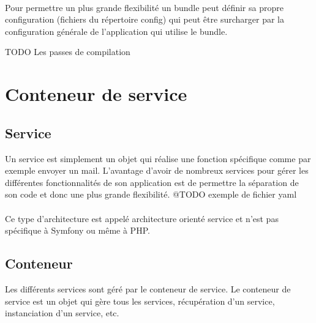 \paragraph{}
Pour permettre un plus grande flexibilité un bundle peut définir sa propre configuration (fichiers du répertoire config) qui peut être surcharger par la configuration générale de l'application qui utilise le bundle.

TODO Les passes de compilation
\section{Conteneur de service}

\subsection{Service}
Un service est simplement un objet qui réalise une fonction spécifique comme par exemple envoyer un mail. L'avantage d'avoir de nombreux services pour gérer les différentes fonctionnalités de son application est de permettre la séparation de son code et donc une plus grande flexibilité.
@TODO exemple de fichier yaml
\paragraph{}
Ce type d'architecture est appelé \og architecture orienté service \fg{} et n'est pas spécifique à Symfony ou même à PHP.
\subsection{Conteneur}
Les différents services sont géré par le conteneur de service. Le conteneur de service est un objet qui gère tous les services, récupération d'un service, instanciation d'un service, etc.
